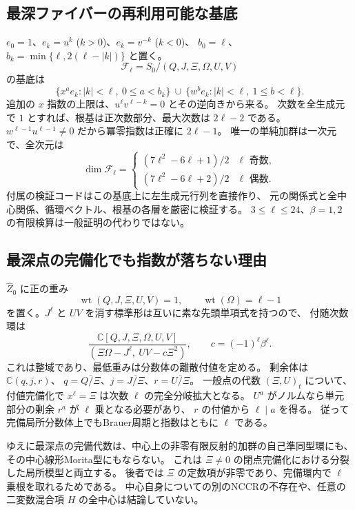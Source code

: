 \subsection{最深ファイバーの再利用可能な基底}

$e_0=1$、$e_k=u^k$ ($k>0$)、$e_k=v^{-k}$ ($k<0$)、
$b_0=\ell$、$b_k=\min\{\ell,2(\ell-|k|)\}$ と置く。
\[
 \mathcal F_\ell=S_0/(Q,J,\Xi,\Omega,U,V)
\]
の基底は
\[
 \{x^ae_k:|k|<\ell,\ 0\le a<b_k\}
 \ \cup\ \{w^be_k:|k|<\ell,\ 1\le b<\ell\}.
\]
追加の $x$ 指数の上限は、$u^\ell v^{\ell-k}=0$ とその逆向きから来る。
次数を全生成元で $1$ とすれば、根基は正次数部分、最大次数は $2\ell-2$ である。
$w^{\ell-1}u^{\ell-1}\ne0$ だから冪零指数は正確に $2\ell-1$。
唯一の単純加群は一次元で、全次元は
\[
 \dim\mathcal F_\ell=
 \begin{cases}(7\ell^2-6\ell+1)/2&\ell\text{ 奇数},\\
 (7\ell^2-6\ell+2)/2&\ell\text{ 偶数}.
 \end{cases}
\]
付属の検証コードはこの基底上に左生成元行列を直接作り、
元の関係式と全中心関係、循環ベクトル、根基の各層を厳密に検証する。
$3\le\ell\le24$、$\beta=1,2$ の有限検算は一般証明の代わりではない。

\subsection{最深点の完備化でも指数が落ちない理由}

$\widehat Z_0$ に正の重み
\[
 \operatorname{wt}(Q,J,\Xi,U,V)=1,\qquad
 \operatorname{wt}(\Omega)=\ell-1
\]
を置く。$J^\ell$ と $UV$ を消す標準形は互いに素な先頭単項式を持つので、
付随次数環は
\[
 \frac{\mathbb C[Q,J,\Xi,\Omega,U,V]}
 {(\Xi\Omega-J^\ell,\ UV-c\Xi^2)},\qquad c=(-1)^\ell\beta^\ell.
\]
これは整域であり、最低重みは分数体の離散付値を定める。
剰余体は $\mathbb C(q,j,r)$、
$q=\overline{Q/\Xi}$、$j=\overline{J/\Xi}$、$r=\overline{U/\Xi}$。
一般点の代数 $(\Xi,U)_t$ について、付値完備化で
$x^\ell=\Xi$ は次数 $\ell$ の完全分岐拡大となる。
$U^a$ がノルムなら単元部分の剰余 $r^a$ が $\ell$ 乗となる必要があり、
$r$ の付値から $\ell\mid a$ を得る。
従って完備局所分数体上でもBrauer周期と指数はともに $\ell$ である。

ゆえに最深点の完備代数は、中心上の非零有限反射的加群の自己準同型環にも、
その中心線形Morita型にもならない。
これは $\Xi\ne0$ の閉点完備化における分裂した局所模型と両立する。
後者では $\Xi$ の定数項が非零であり、完備環内で $\ell$ 乗根を取れるためである。
中心自身についての別のNCCRの不存在や、任意の二変数混合項 $H$ の全中心は結論していない。

